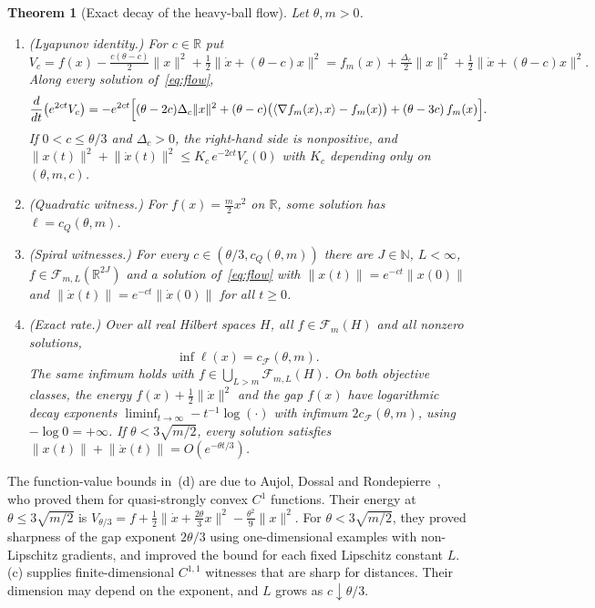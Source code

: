 \documentclass[11pt]{article}
\newtheorem{theorem}{Theorem}[section]
\theoremstyle{definition}
\theoremstyle{remark}
\newcommand{\R}{\mathbb R}
\newcommand{\N}{\mathbb N}
\newcommand{\cF}{\mathcal F}
\newcommand{\ip}[2]{\langle #1,#2\rangle}
\newcommand{\norm}[1]{\lVert #1\rVert}
\newcommand{\cQ}{c_{Q}}
\newcommand{\cFF}{c_{\cF}}
\newcommand{\cFm}{\cF_m}
\begin{document}
\begin{theorem}[Exact decay of the heavy-ball flow]\label{thm:flow}
Let \(\theta,m>0\).
\begin{enumerate}[label=\textup{(\alph*)}]
\item \textup{(Lyapunov identity.)}  For \(c\in\R\) put
\[
V_c=f(x)-\tfrac{c(\theta-c)}2\norm x^2+\tfrac12\norm{\dot x+(\theta-c)x}^2
=f_m(x)+\tfrac{\Delta_c}2\norm x^2+\tfrac12\norm{\dot x+(\theta-c)x}^2 .
\]
Along every solution of~\eqref{eq:flow},
\begin{equation}\label{eq:identity}
\frac{d}{dt}\bigl(e^{2ct}V_c\bigr)=-e^{2ct}\Bigl[(\theta-2c)\Delta_c\norm x^2+(\theta-c)\bigl(\ip{\nabla f_m(x)}x-f_m(x)\bigr)+(\theta-3c)\,f_m(x)\Bigr].
\end{equation}
If \(0<c\le\theta/3\) and \(\Delta_c>0\), the right-hand side is nonpositive, and
\(\norm{x(t)}^2+\norm{\dot x(t)}^2\le K_c\,e^{-2ct}V_c(0)\) with \(K_c\) depending only on \((\theta,m,c)\).
\item \textup{(Quadratic witness.)}  For \(f(x)=\frac m2x^2\) on \(\R\), some solution has \(\ell=\cQ(\theta,m)\).
\item \textup{(Spiral witnesses.)}  For every \(c\in(\theta/3,\cQ(\theta,m))\) there are \(J\in\N\), \(L<\infty\),
\(f\in\cF_{m,L}(\R^{2J})\) and a solution of~\eqref{eq:flow} with \(\norm{x(t)}=e^{-ct}\norm{x(0)}\) and
\(\norm{\dot x(t)}=e^{-ct}\norm{\dot x(0)}\) for all \(t\ge0\).
\item \textup{(Exact rate.)}  Over all real Hilbert spaces \(H\), all
\(f\in\cFm(H)\) and all nonzero solutions,
\[
\inf\ell(x)=\cFF(\theta,m).
\]
The same infimum holds with \(f\in\bigcup_{L>m}\cF_{m,L}(H)\).
On both objective classes, the energy \(f(x)+\frac12\norm{\dot x}^2\)
and the gap \(f(x)\) have logarithmic decay exponents
\(\liminf_{t\to\infty}-t^{-1}\log(\cdot)\) with infimum \(2\cFF(\theta,m)\),
using \(-\log0=+\infty\).
If \(\theta<3\sqrt{m/2}\), every solution satisfies
\(\norm{x(t)}+\norm{\dot x(t)}=O(e^{-\theta t/3})\).
\end{enumerate}
\end{theorem}

The function-value bounds in~(d) are due to Aujol, Dossal and
Rondepierre~\cite{ADR22}, who proved them for quasi-strongly convex \(C^1\)
functions.  Their energy at \(\theta\le3\sqrt{m/2}\) is
\(V_{\theta/3}=f+\frac12\norm{\dot x+\frac{2\theta}3x}^2-\frac{\theta^2}9\norm x^2\).
For \(\theta<3\sqrt{m/2}\), they proved sharpness of the gap exponent
\(2\theta/3\) using one-dimensional examples with non-Lipschitz gradients,
and improved the bound for each fixed Lipschitz constant \(L\).
(c) supplies finite-dimensional \(C^{1,1}\) witnesses that are
sharp for distances.  Their dimension may depend on the exponent, and
\(L\) grows as \(c\downarrow\theta/3\).
\end{document}
